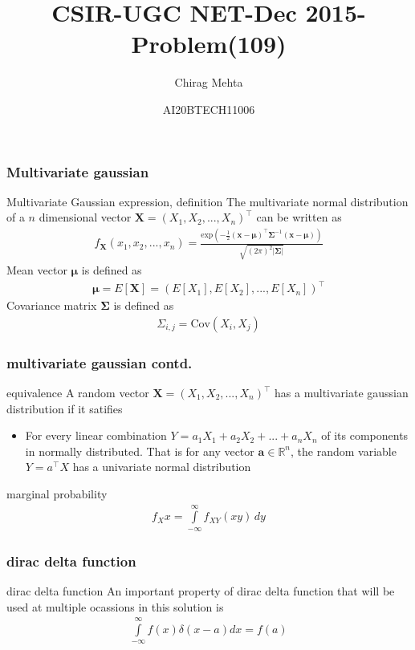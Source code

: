\documentclass{beamer}
\title{CSIR-UGC NET-Dec 2015-Problem(109)}
\author{Chirag Mehta}
\date{AI20BTECH11006}
\providecommand{\sbrak}[1]{\ensuremath{{}\left[#1\right]}}
\providecommand{\brak}[1]{\ensuremath{\left(#1\right)}}
\providecommand{\abs}[1]{\vert#1\vert}
\begin{document}
\begin{frame}
\titlepage
\end{frame}
\begin{frame}
\frametitle{Multivariate gaussian}
\begin{block}{Multivariate Gaussian expression, definition}
The multivariate normal distribution of a $n$ dimensional vector $\boldsymbol{X}=\brak{X_1,X_2,...,X_n}^\top$ can be written as
\begin{align}
f_{\boldsymbol{X}}(x_1,x_2,...,x_n)=\frac{\text{exp}\brak{-\frac{1}{2}\brak{\boldsymbol{x-\mu}}^\top\boldsymbol{\Sigma}^{-1}\brak{\boldsymbol{x-\mu}}}}{\sqrt{(2\pi)^2\abs{\boldsymbol{\Sigma}}}}
\end{align}
Mean vector $\boldsymbol{\mu}$ is defined as
\begin{align}
\boldsymbol{\mu}=E\sbrak{\boldsymbol{X}}=\brak{E\sbrak{X_1},E\sbrak{X_2},...,E\sbrak{X_n}}^\top
\end{align}
Covariance matrix $\boldsymbol{\Sigma}$ is defined as
\begin{align}
\Sigma_{i,j}=\text{Cov}\brak{X_i,X_j}
\end{align}

\end{block}
\end{frame}


\begin{frame}
\frametitle{multivariate gaussian contd.}
\begin{block}{equivalence}
A random vector $\boldsymbol{X}=\brak{X_1,X_2,...,X_n}^\top$ has a multivariate gaussian distribution if it satifies\\
\begin{itemize}
\item For every linear combination $Y=a_1X_1+a_2X_2+...+a_nX_n$ of its components in normally distributed. That is for any vector $\boldsymbol{a}\in\mathbb{R}^n$, the random variable $Y=a^\top X$ has a univariate normal distribution
\end{itemize}
\end{block}
\begin{block}{marginal probability}
\begin{align}
f_X{x}=\int\limits_{-\infty}^{\infty}f_{XY}(xy)\,dy
\end{align}
\end{block}
\end{frame}


\begin{frame}
\frametitle{dirac delta function}
\begin{block}{dirac delta function}
An important property of dirac delta function that will be used at multiple ocassions in this solution is
\begin{align}
\displaystyle\int\limits_{-\infty}^{\infty} f(x)\delta(x-a)dx=f(a) \label{eq:dirac}
\end{align}
\end{block}
\end{frame}
\end{document}
